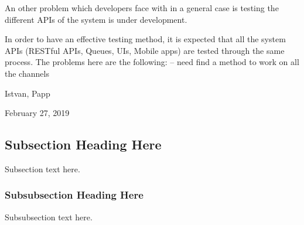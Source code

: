 \documentclass[conference]{IEEEtran}
\begin{document}
An other problem which developers face with in a general case is testing the different APIs of the system is under development. 

In order to have an effective testing method, it is expected that all the system APIs (RESTful APIs, Queues, UIs, Mobile apps) are tested through the same process. The problems here are the following:
-- need find a method to work on all the channels

\hfill Istvan, Papp
 
\hfill February 27, 2019

\subsection{Subsection Heading Here}
Subsection text here.


\subsubsection{Subsubsection Heading Here}
Subsubsection text here.


%
%

\end{document}
